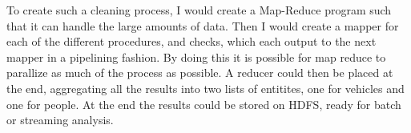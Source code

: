 To create such a cleaning process, I would create a Map-Reduce program such that it can handle the large amounts of data. Then I would create a mapper for each of the different procedures, and checks, which each output to the next mapper in a pipelining fashion. By doing this it is possible for map reduce to parallize as much of the process as possible. A reducer could then be placed at the end, aggregating all the results into two lists of entitites, one for vehicles and one for people. At the end the results could be stored on HDFS, ready for batch or streaming analysis.